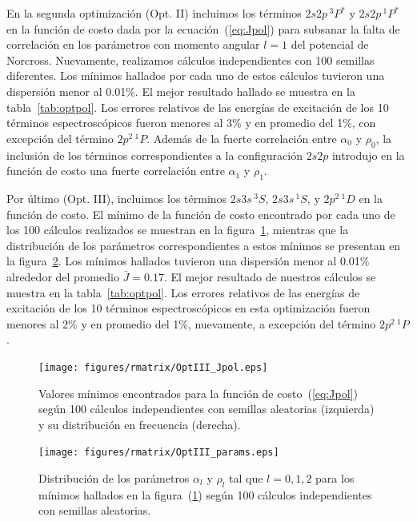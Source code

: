 En la segunda optimización (Opt. II) incluimos los términos $2s2p\,^3P^*$ 
y $2s2p\,^1P^*$ en la función de costo dada por la ecuación~(\ref{eq:Jpol}) 
para subsanar la falta de correlación en los parámetros con momento 
angular $l=1$ del potencial de Norcross. Nuevamente, realizamos cálculos 
independientes con 100 semillas diferentes. Los mínimos hallados por cada 
uno de estos cálculos tuvieron una dispersión menor al 0.01\%. El mejor 
resultado hallado se muestra en la tabla~\ref{tab:optpol}. Los errores 
relativos de las energías de excitación de los 10 términos 
espectroscópicos fueron menores al 3\% y en promedio del 1\%, con 
excepción del término $2p^2\,^1P$. Además de la fuerte correlación entre 
$\alpha_0$ y $\rho_0$, la inclusión de los términos correspondientes a la 
configuración $2s2p$ introdujo en la función de costo una fuerte 
correlación entre $\alpha_1$ y $\rho_1$.

Por último (Opt. III), incluimos los términos $2s3s\,^3S$, $2s3s\,^1S$, y 
$2p^2\,^1D$ en la función de costo. El mínimo de la función de costo 
encontrado por cada uno de los 100 cálculos realizados se muestran en la 
figura~\ref{fig:OptIII-100min-Jpol}, mientras que la distribución de los 
parámetros correspondientes a estos mínimos se presentan en la 
figura~\ref{fig:OptIII-100min-params}. Los mínimos hallados tuvieron una 
dispersión menor al 0.01\% alrededor del promedio $\bar{J}=0.17$. El 
mejor resultado de nuestros cálculos se muestra en la 
tabla~\ref{tab:optpol}. Los errores relativos de las energías de 
excitación de los 10 términos espectroscópicos en esta optimización 
fueron menores al 2\% y en promedio del 1\%, nuevamente, a excepción del 
término $2p^2\,^1P$. 

\begin{figure}
\texttt{[image: figures/rmatrix/OptIII\_Jpol.eps]}
\caption[Mínimos de la función de costo según 100 semillas aleatorias.]
{Valores mínimos encontrados para la función de costo~(\ref{eq:Jpol}) 
según 100 cálculos independientes con semillas aleatorias (izquierda) y
su distribución en frecuencia (derecha).}
\label{fig:OptIII-100min-Jpol}
\end{figure}
\begin{figure}
\texttt{[image: figures/rmatrix/OptIII\_params.eps]}
\caption[Distribución de parámetros según 100 semillas aleatorias.]
{Distribución de los parámetros $\alpha_l$ y $\rho_l$ tal que $l=0,1,2$ 
para los mínimos hallados en la figura~(\ref{fig:OptIII-100min-Jpol}) 
según 100 cálculos independientes con semillas aleatorias.}
\label{fig:OptIII-100min-params}
\end{figure}

